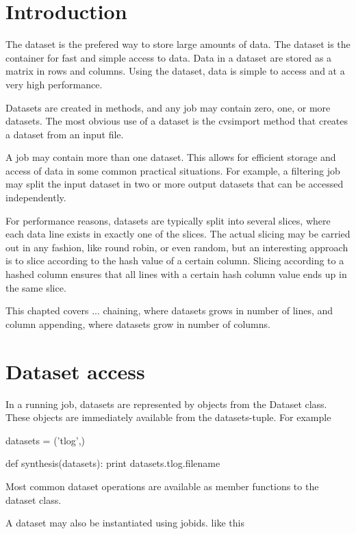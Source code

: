 \section{Introduction}

The dataset is the prefered way to store large amounts of data.  The
dataset is the container for fast and simple access to data.  Data in
a dataset are stored as a matrix in rows and columns.  Using the
dataset, data is simple to access and at a very high performance.

Datasets are created in methods, and any job may contain zero, one, or
more datasets.  The most obvious use of a dataset is the cvsimport
method that creates a dataset from an input file.

A job may contain more than one dataset.  This allows for efficient
storage and access of data in some common practical situations.  For
example, a filtering job may split the input dataset in two or more
output datasets that can be accessed independently.

For performance reasons, datasets are typically split into several
slices, where each data line exists in exactly one of the slices.  The
actual slicing may be carried out in any fashion, like round robin, or
even random, but an interesting approach is to slice according to the
hash value of a certain column.  Slicing according to a hashed column
ensures that all lines with a certain hash column value ends up in the
same slice.

This chapted covers ...
chaining, where datasets grows in number of lines, and column
appending, where datasets grow in number of columns.



\newpage
\section{Dataset access}

In a running job, datasets are represented by objects from the Dataset
class.  These objects are immediately available from the
datasets-tuple.  For example

\begin{python}
datasets = ('tlog',)

def synthesis(datasets):
  print datasets.tlog.filename
\end{python}
Most common dataset operations are available as member functions
to the dataset class.

A dataset may also be instantiated using jobids. like this

